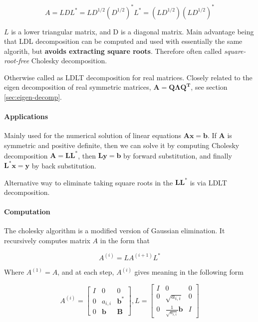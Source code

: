 \begin{equation*}
    A = LDL^* = LD^{1/2}(D^{1/2})^*L^* = \left(LD^{1/2}\right) \left(LD^{1/2}\right)^*
\end{equation*}

$L$ is a lower triangular matrix, and D is a diagonal matrix. Main advantage being that LDL
decomposition can be computed and used with essentially the same algorith, but \textbf{avoids extracting
square roots}. Therefore often called \emph{square-root-free} Cholesky decomposition.

Otherwise called as LDLT decomposition for real matrices. Closely related to the
eigen decomposition of real symmetric matrices, $\mathbf{A = Q\Lambda Q^T}$,
see section \ref{sec:eigen-decomp}.

\paragraph{Applications} Mainly used for the numerical solution of linear equations 
$\mathbf{Ax = b}$. If $\mathbf{A}$ is symmetric and positive definite, then we can solve
it by computing Cholesky decomposition $\mathbf{A = LL^*}$, then $\mathbf{Ly = b}$ by
forward substitution, and finally $\mathbf{L^*x = y}$ by back substitution.

Alternative way to eliminate taking square roots in the $\mathbf{LL^*}$ is via LDLT decomposition.

\paragraph{Computation}

The cholesky algorithm is a modified version of Gaussian elimination. It recursively computes matrix $A$
in the form that

\begin{equation*}
    A^{(i)} = LA^{(i+1)}L^*
\end{equation*}

Where $A^{(1)} = A$, and at each step, $A^{(i)}$ gives meaning in the following form

\begin{equation*}
    A^{(i)} = \begin{bmatrix}
        I & 0 & 0 \\ 0 & a_{i, i} & \mathbf{b}^* \\ 0 & \mathbf{b} & \mathbf{B}
    \end{bmatrix}, 
    L = \begin{bmatrix}
        I & 0 & 0 \\ 0 & \sqrt{a_{i, i}} & 0 \\ 0 & \frac{1}{\sqrt{a_{i, i}}}\mathbf{b} & I
    \end{bmatrix}
\end{equation*}

